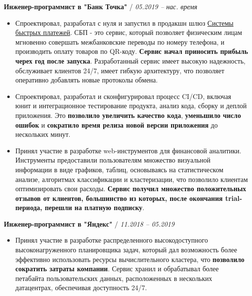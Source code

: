 \documentclass[a4paper,10pt]{article}
\newcommand{\notice}[1]{{\textcolor{dark}{\textbf{#1}}}}
\newcommand{\info}[1]{{\textcolor{darkdark}{\textbf{#1}}}}
\begin{document}
    \begin{adjustwidth}{10pt}{10pt}

        \notice{Инженер-программист в "Банк Точка"} / \textit{05.2019 – нас. время}

        \begin{itemize}

        \item Спроектировал, разработал с нуля и запустил в продакшн шлюз \href{https://sbp.nspk.ru/}{Системы быстрых платежей}. СБП - это сервис, который позволяет физическим лицам мгновенно совершать межбанковские переводы по номеру телефона, и производить оплату товаров по QR-коду. \info{Сервис начал приносить прибыль черех год после запуска}. Разработанный сервис имеет высокую надежность, обслуживает клиентов 24/7, имеет гибкую архитектуру, что позволяет оперативно добавлять новые протоколы обмена.

        \item Спроектировал, разработал и сконфигурировал процесс CI/CD, включая юнит и интеграционное тестирование продукта, анализ кода, сборку и деплой приложения. Это \info{позволило увеличить качество кода}, \info{уменьшило число ошибок} и \info{сократило время релиза новой версии приложения} до нескольких минут.

        \item Принял участие в разработке web-инструментов для финансовой аналитики. Инструменты предоставили пользователям множество визуальной информации в виде графиков, таблиц, основываясь на статистическом анализе, алгоритмах классификации и кластеризации, что позволило клиентам оптимизировать свои расходы. \info{Сервис получил множество положительных отзывов от клиентов, большинство из которых, после окончания trial-периода, перешли на платную подписку}.

        \end{itemize}


        \notice{Инженер-программист в "Яндекс"} / \textit{11.2018 – 05.2019}

        \begin{itemize}

        \item Принял участие в разработке распределенного высокодоступного высоконагруженного планировщика задач, который дал возможность более эффективно использовать ресурсы вычислительного кластера, что \info{позволило сократить затраты компании}. Сервис хранил и обрабатывал более петабайта пользовательских данных, расположенных в нескольких датацентрах, обеспечивая доступность 24/7.


\end{itemize}
\end{adjustwidth}
\end{document}
